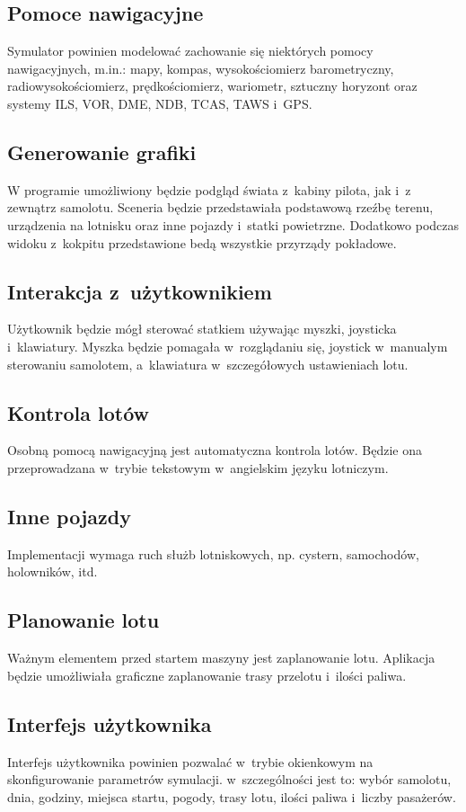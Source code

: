 \documentclass{mwrep}
\begin{document}
\subsection{Pomoce nawigacyjne}
Symulator powinien modelować zachowanie się niektórych pomocy nawigacyjnych, m.in.: mapy, kompas, wysokościomierz barometryczny, radiowysokościomierz, prędkościomierz, wariometr, sztuczny horyzont oraz systemy ILS, VOR, DME, NDB, TCAS, TAWS i~GPS.

\subsection{Generowanie grafiki}
W programie umożliwiony będzie podgląd świata z~kabiny pilota, jak i~z zewnątrz samolotu. Sceneria będzie przedstawiała podstawową rzeźbę terenu, urządzenia na lotnisku oraz inne pojazdy i~statki powietrzne. Dodatkowo podczas widoku z~kokpitu przedstawione bedą wszystkie przyrządy pokładowe.

\subsection{Interakcja z~użytkownikiem}
Użytkownik będzie mógł sterować statkiem używając myszki, joysticka i~klawiatury. Myszka będzie pomagała w~rozglądaniu się, joystick w~manualym sterowaniu samolotem, a~klawiatura w~szczegółowych ustawieniach lotu.

\subsection{Kontrola lotów}
Osobną pomocą nawigacyjną jest automatyczna kontrola lotów. Będzie ona przeprowadzana w~trybie tekstowym w~angielskim języku lotniczym.

\subsection{Inne pojazdy}
Implementacji wymaga ruch służb lotniskowych, np. cystern, samochodów, holowników, itd.

\subsection{Planowanie lotu}
Ważnym elementem przed startem maszyny jest zaplanowanie lotu. Aplikacja będzie umożliwiała graficzne zaplanowanie trasy przelotu i~ilości paliwa.

\subsection{Interfejs użytkownika}
Interfejs użytkownika powinien pozwalać w~trybie okienkowym na skonfigurowanie parametrów symulacji. w~szczególności jest to: wybór samolotu, dnia, godziny, miejsca startu, pogody, trasy lotu, ilości paliwa i~liczby pasażerów.
\end{document}

